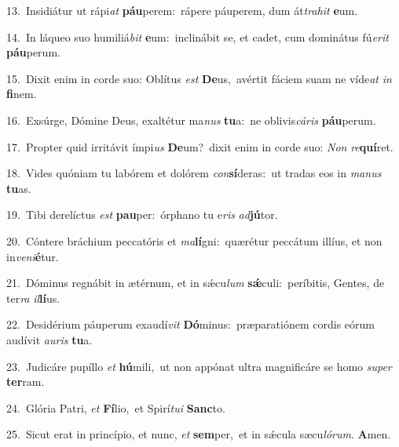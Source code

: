 {\numbfont\textcolor{\numbcolor}{13.}}~Insidiátur ut rápi\textit{at} \textbf{páu}\-perem:~\star rápere páuperem, dum át\-\textit{tra}\-\textit{hit} \textbf{e}\-um.\par
{\numbfont\textcolor{\numbcolor}{14.}}~In láqueo suo humiliá\textit{bit} \textbf{e}\-um:~\star inclinábit se, et cadet, cum dominátus fú\-\textit{e}\-\textit{rit} \textbf{páu}\-perum.\par
{\numbfont\textcolor{\numbcolor}{15.}}~Dixit enim in corde suo: Oblítus \textit{est} \textbf{De}\-us,~\star avértit fáciem suam ne víde\textit{at} \textit{in} \textbf{fi}\-nem.\par
{\numbfont\textcolor{\numbcolor}{16.}}~Exsúrge, Dómine Deus, exaltétur ma\textit{nus} \textbf{tu}\-a:~\star ne oblivis\-\textit{cá}\-\textit{ris} \textbf{páu}\-perum.\par
{\numbfont\textcolor{\numbcolor}{17.}}~Propter quid irritávit ímpi\textit{us} \textbf{De}\-um?~\star dixit enim in corde suo: \textit{Non} \textit{re}\-\textbf{quí}ret.\par
{\numbfont\textcolor{\numbcolor}{18.}}~Vides quóniam tu labórem et dolórem \textit{con}\-\textbf{sí}deras:~\star ut tradas eos in \textit{ma}\-\textit{nus} \textbf{tu}\-as.\par
{\numbfont\textcolor{\numbcolor}{19.}}~Tibi derelíctus \textit{est} \textbf{pau}\-per:~\star órphano tu e\textit{ris} \textit{ad}\-\textbf{jú}tor.\par
{\numbfont\textcolor{\numbcolor}{20.}}~Cóntere bráchium peccatóris et \textit{ma}\-\textbf{lí}gni:~\star quærétur peccátum illíus, et non in\-\textit{ve}\-\textit{ni}\textbf{é}tur.\par
{\numbfont\textcolor{\numbcolor}{21.}}~Dóminus regnábit in ætérnum, et in sǽcu\textit{lum} \textbf{sǽ}\-culi:~\star períbitis, Gentes, de ter\textit{ra} \textit{il}\-\textbf{lí}us.\par
{\numbfont\textcolor{\numbcolor}{22.}}~Desidérium páuperum exaudí\textit{vit} \textbf{Dó}\-minus:~\star præparatiónem cordis eórum audívit \textit{au}\-\textit{ris} \textbf{tu}\-a.\par
{\numbfont\textcolor{\numbcolor}{23.}}~Judicáre pupíllo \textit{et} \textbf{hú}\-mili,~\star ut non appónat ultra magnificáre se homo \textit{su}\-\textit{per} \textbf{ter}\-ram.\par
{\numbfont\textcolor{\numbcolor}{24.}}~Glória Patri, \textit{et} \textbf{Fí}\-lio,~\star et Spirí\-\textit{tu}\-\textit{i} \textbf{Sanc}\-to.\par
{\numbfont\textcolor{\numbcolor}{25.}}~Sicut erat in princípio, et nunc, \textit{et} \textbf{sem}\-per,~\star et in sǽcula sæcu\-\textit{ló}\-\textit{rum}. \textbf{A}\-men.\par
